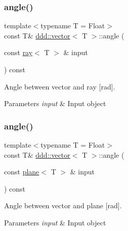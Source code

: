 \subsubsection{\texorpdfstring{angle()}{angle()}\hspace{0.1cm}{\footnotesize\ttfamily [3/5]}}
{\footnotesize\ttfamily template$<$typename T = Float$>$ \\
const T\& \hyperlink{classddd_1_1vector}{ddd\+::vector}$<$ T $>$\+::angle (\begin{DoxyParamCaption}\item[{const \hyperlink{classddd_1_1ray}{ray}$<$ T $>$ \&}]{input }\end{DoxyParamCaption}) const\hspace{0.3cm}{\ttfamily [inline]}}



Angle between vector and ray \mbox{[}rad\mbox{]}. 


\begin{DoxyParams}{Parameters}
{\em input} & Input object \\
\hline
\end{DoxyParams}
\mbox{\label{classddd_1_1vector_a6e6f7e86378329051b53b969bdb607ae}} 
\subsubsection{\texorpdfstring{angle()}{angle()}\hspace{0.1cm}{\footnotesize\ttfamily [4/5]}}
{\footnotesize\ttfamily template$<$typename T = Float$>$ \\
const T\& \hyperlink{classddd_1_1vector}{ddd\+::vector}$<$ T $>$\+::angle (\begin{DoxyParamCaption}\item[{const \hyperlink{classddd_1_1plane}{plane}$<$ T $>$ \&}]{input }\end{DoxyParamCaption}) const\hspace{0.3cm}{\ttfamily [inline]}}



Angle between vector and plane \mbox{[}rad\mbox{]}. 


\begin{DoxyParams}{Parameters}
{\em input} & Input object \\
\hline
\end{DoxyParams}
\mbox{\label{classddd_1_1vector_aa1d50d563f55d5795d565ed70ec5b845}} 
